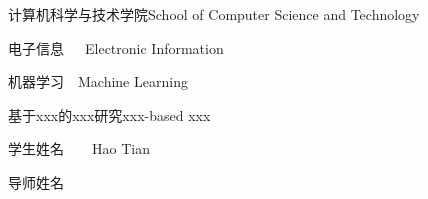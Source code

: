
\school
{计算机科学与技术学院}{School of Computer Science and Technology}

\major
{电子信息~~~}{Electronic Information}

\direct
{机器学习~~}{Machine Learning}

\thesistitle
{基于xxx的xxx研究}{xxx-based xxx}  %

\thesisauthor
{学生姓名~~~~}{Hao Tian}

\teacher
{导师姓名}{}





